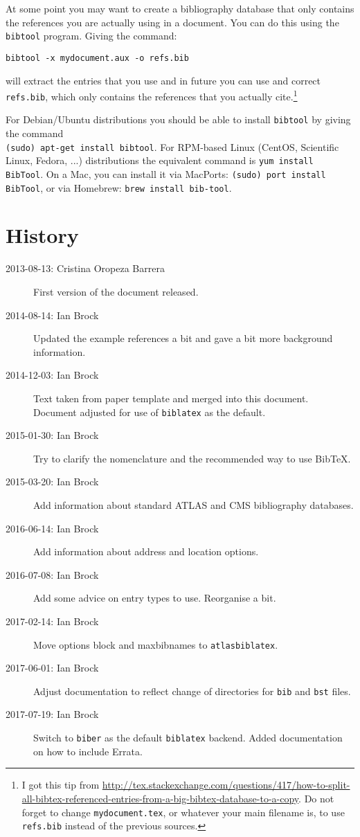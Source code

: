 \documentclass[UKenglish, texlive=2016]{\ATLASLATEXPATH atlasdoc}
\newcommand*{\BibTeX}{Bib\TeX}
\newcommand{\File}[1]{\texttt{#1}\xspace}
\newcommand{\Option}[1]{\textsf{#1}\xspace}
\newcommand{\Package}[1]{\texttt{#1}\xspace}
\begin{document}
At some point you may want to create a bibliography database that only contains the references you are actually using in a document.
You can do this using the \File{bibtool} program.
Giving the command:
\begin{verbatim}
bibtool -x mydocument.aux -o refs.bib
\end{verbatim}
will extract the entries that you use and in future you can use and
correct \texttt{refs.bib}, which only contains the references that you
actually cite.\footnote{%
I got this tip from
\url{http://tex.stackexchange.com/questions/417/how-to-split-all-bibtex-referenced-entries-from-a-big-bibtex-database-to-a-copy}. Do
not forget to change \texttt{mydocument.tex}, or whatever your main filename is, to use
\texttt{refs.bib} instead of the previous sources.}

For Debian/Ubuntu distributions you should be able to install \File{bibtool} by giving the command\\
\verb|(sudo) apt-get install bibtool|.
For RPM-based Linux (CentOS, Scientific Linux, Fedora, ...) distributions the equivalent command is \verb|yum install BibTool|.
On a Mac, you can install it via MacPorts: \verb|(sudo) port install BibTool|,
or via Homebrew: \verb|brew install bib-tool|.


\section*{History}

\begin{description}
\item[2013-08-13: Cristina Oropeza Barrera] First version of the document released.
\item[2014-08-14: Ian Brock] Updated the example references a bit and gave a bit more background information.
\item[2014-12-03: Ian Brock] Text taken from paper template and merged into this document.
  Document adjusted for use of \Package{biblatex} as the default.
\item[2015-01-30: Ian Brock] Try to clarify the nomenclature and
  the recommended way to use \BibTeX.
\item[2015-03-20: Ian Brock] Add information about standard ATLAS and CMS bibliography databases.
\item[2016-06-14: Ian Brock] Add information about address and location options.
\item[2016-07-08: Ian Brock] Add some advice on entry types to use. Reorganise a bit.
\item[2017-02-14: Ian Brock] Move options \Option{block} and \Option{maxbibnames} to \Package{atlasbiblatex}.
\item[2017-06-01: Ian Brock] Adjust documentation to reflect change of directories for \File{bib} and \File{bst} files.
\item[2017-07-19: Ian Brock] Switch to \texttt{biber} as the default \Package{biblatex} backend.
  Added documentation on how to include Errata.
\end{description}
\end{document}
